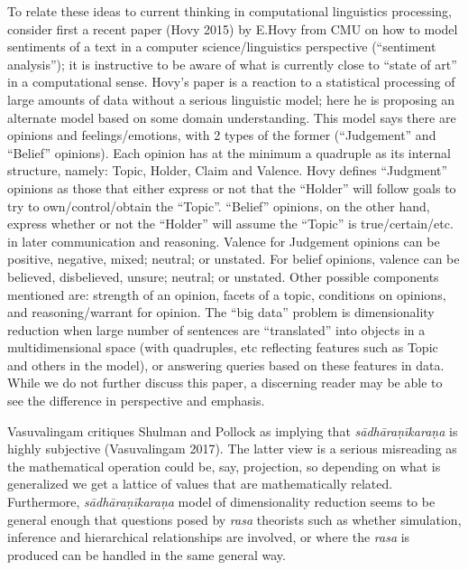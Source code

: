 \newpage

To relate these ideas to current thinking in computational linguistics processing, consider first a recent paper (Hovy 2015) by E.Hovy from CMU on how to model sentiments of a text in a computer science/linguistics perspective (“sentiment analysis”); it is instructive to be aware of what is currently close to “state of art” in a computational sense. Hovy’s paper is a reaction to a statistical processing of large amounts of data without a serious linguistic model; here he is proposing an alternate model based on some domain understanding. This model says there are opinions and feelings/emotions, with 2 types of the former (“Judgement” and “Belief” opinions). Each opinion has at the minimum a quadruple as its internal structure, namely: Topic, Holder, Claim and Valence. Hovy defines “Judgment” opinions as those that either express or not that the “Holder” will follow goals to try to own/control/obtain the “Topic”. “Belief” opinions, on the other hand, express whether or not the “Holder” will assume the “Topic” is true/certain/etc. in later communication and reasoning. Valence for Judgement opinions can be positive, negative, mixed; neutral; or unstated. For belief opinions, valence can be believed, disbelieved, unsure; neutral; or unstated. Other possible components mentioned are: strength of an opinion, facets of a topic, conditions on opinions, and reasoning/warrant for opinion. The “big data” problem is dimensionality reduction when large number of sentences are “translated” into objects in a multidimensional space (with quadruples, etc reflecting features such as Topic and others in the model), or answering queries based on these features in data. While we do not further discuss this paper, a discerning reader may be able to see the difference in perspective and emphasis.

Vasuvalingam critiques Shulman and Pollock as implying that \textsl{sādhāraṇīkaraṇa} is highly subjective (Vasuvalingam 2017). The latter view is a serious misreading as the mathematical operation could be, say, projection, so depending on what is generalized we get a lattice of values that are mathematically related. Furthermore, \textsl{sādhāraṇīkaraṇa} model of dimensionality reduction seems to be general enough that questions posed by \textsl{rasa} theorists such as whether simulation, inference and hierarchical relationships are involved, or where the \textsl{rasa} is produced can be handled in the same general way.

